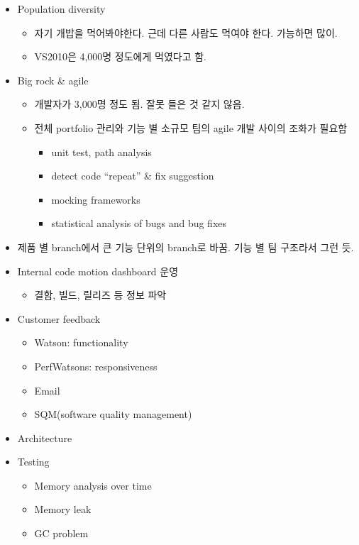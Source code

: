 \documentclass[11pt]{article}
\begin{document}
\begin{itemize}
\item Population diversity
    \begin{itemize}
    \item 자기 개밥을 먹어봐야한다. 근데 다른 사람도 먹여야 한다. 가능하면 많이.
    \item VS2010은 4,000명 정도에게 먹였다고 함.
    \end{itemize}
\item Big rock \& agile
    \begin{itemize}
    \item 개발자가 3,000명 정도 됨. 잘못 들은 것 같지 않음.
    \item 전체 portfolio 관리와 기능 별 소규모 팀의 agile 개발 사이의 
    조화가 필요함
        \begin{itemize}
        \item unit test, path analysis
        \item detect code ``repeat'' \& fix suggestion
        \item mocking frameworks
        \item statistical analysis of bugs and bug fixes
        \end{itemize}
    \end{itemize}
\item 제품 별 branch에서 큰 기능 단위의 branch로 바꿈. 
기능 별 팀 구조라서 그런 듯.
\item Internal code motion dashboard 운영
    \begin{itemize}
    \item 결함, 빌드, 릴리즈 등 정보 파악
    \end{itemize}
\item Customer feedback
    \begin{itemize}
    \item Watson: functionality
    \item PerfWatsons: responsiveness
    \item Email
    \item SQM(software quality management)
    \end{itemize}
\item Architecture
\item Testing
    \begin{itemize}
    \item Memory analysis over time
    \item Memory leak
    \item GC problem
    \end{itemize}
\end{itemize}
\end{document}
